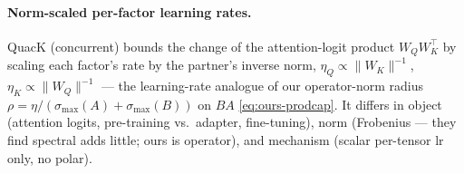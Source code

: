 \documentclass[11pt]{article}
\newcommand{\smax}{\sigma_{\max}}
\theoremstyle{plain}
\theoremstyle{definition}
\theoremstyle{remark}
\begin{document}
\paragraph{Norm-scaled per-factor learning rates.} QuacK \cite{quack} (concurrent) bounds the change of the attention-logit product $W_QW_K^\top$ by scaling each factor's rate by the partner's inverse norm, $\eta_Q\propto\|W_K\|^{-1}$, $\eta_K\propto\|W_Q\|^{-1}$ --- the learning-rate analogue of our operator-norm radius $\rho=\eta/(\smax(A)+\smax(B))$ on $BA$ \eqref{eq:ours-prodcap}. It differs in object (attention logits, pre-training vs.\ adapter, fine-tuning), norm (Frobenius --- they find spectral adds little; ours is operator), and mechanism (scalar per-tensor lr only, no polar).

\end{document}
